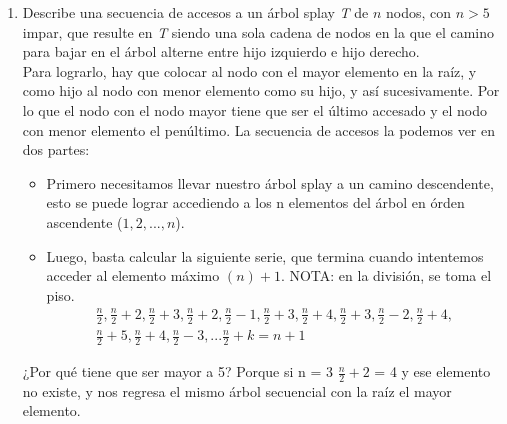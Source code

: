 \documentclass[spanish,12pt,letterpaper]{article}
\begin{document}
\begin{enumerate}
\item Describe una secuencia de accesos a un árbol splay \textit{T} de $n$ nodos,
  con $n > 5$ impar, que resulte en \textit{T} siendo una sola cadena de nodos en
  la que el camino para bajar en el árbol alterne entre hijo izquierdo e hijo
  derecho.\\
  Para lograrlo, hay que colocar al nodo con el mayor elemento en la raíz, y como
  hijo al nodo con menor elemento como su hijo, y así sucesivamente. Por lo que
  el nodo con el nodo mayor tiene que ser el último accesado y el nodo con menor
  elemento el penúltimo. La secuencia de accesos la podemos ver en dos partes:
  \begin{itemize}
  \item Primero necesitamos llevar nuestro árbol splay a un camino descendente,
    esto se puede lograr accediendo a los n elementos del árbol en órden
    ascendente ($1,2, ..., n$).
  \item Luego, basta calcular la siguiente serie, que termina cuando intentemos
    acceder al elemento máximo $(n)+1$. NOTA: en la división, se toma el piso.
    \begin{align*}
      \frac{n}{2}, \frac{n}{2}+2, \frac{n}{2}+3, \frac{n}{2}+2, \frac{n}{2}-1,
      \frac{n}{2}+3, \frac{n}{2}+4, \frac{n}{2}+3, \frac{n}{2}-2, \frac{n}{2}+4,
      \\
      \frac{n}{2}+5, \frac{n}{2}+4, \frac{n}{2}-3, ... \frac{n}{2}+k = n+1
    \end{align*}
  \end{itemize}
  ¿Por qué tiene que ser mayor a 5? Porque si n = 3 $\frac{n}{2}+2$ = 4 y ese
  elemento no existe, y nos regresa el mismo árbol secuencial con la raíz el
  mayor elemento.\\
  

\end{enumerate}
\end{document}
